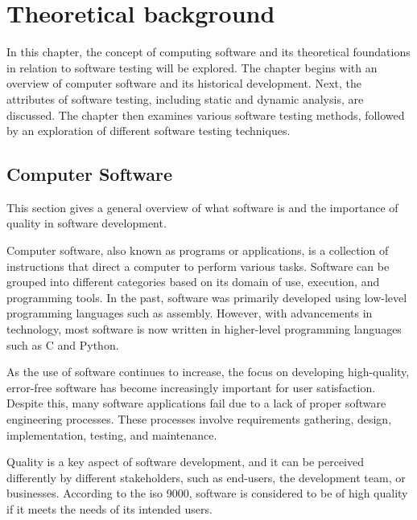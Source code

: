 \vspace{21.5pt}
\chapter{Theoretical background}

In this chapter, the concept of computing software and its theoretical foundations in relation to
software testing will be explored. The chapter begins with an overview of computer software and
its historical development. Next, the attributes of software testing, including static and dynamic
analysis, are discussed. The chapter then examines various software testing methods, followed by
an exploration of different software testing techniques.

\section{Computer Software}
This section gives a general overview of what software is and the importance of quality in
software development.

Computer software, also known as programs or applications, is a collection of instructions that
direct a computer to perform various tasks\cite{Software76:online}. Software can be grouped into
different categories based on its domain of use, execution, and programming tools. In the past,
software was primarily developed using low-level programming languages such as assembly. However,
with advancements in technology, most software is now written in higher-level programming
languages such as C and Python.

As the use of software continues to increase, the focus on developing high-quality,
error-free software has become increasingly important for user satisfaction. Despite this,
many software applications fail due to a lack of proper software engineering processes.
These processes involve requirements gathering, design, implementation, testing, and maintenance.

Quality is a key aspect of software development, and it can be perceived differently by different
stakeholders, such as end-users, the development team, or businesses. According to the
\acrlong{iso} 9000, software is considered to be of high quality if it meets the needs of its intended users.

